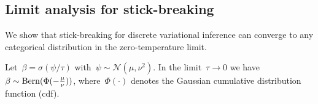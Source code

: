 \subsection{Limit analysis for stick-breaking}
\label{sec:sblimits}
We show that stick-breaking for discrete variational inference can
converge to any categorical distribution in the zero-temperature
limit.

  Let~${\beta=\sigma(\psi / \tau)}$
  with~${\psi\sim\mathcal{N}(\mu,\nu^2)}$.  In the
  limit~${\tau \to
    0}$ we have~${\beta \sim \mathrm{Bern}(\Phi(-\tfrac{\mu}{\nu}))}$,
  where~$\Phi(\cdot)$ denotes the Gaussian cumulative distribution
  function (cdf). 
